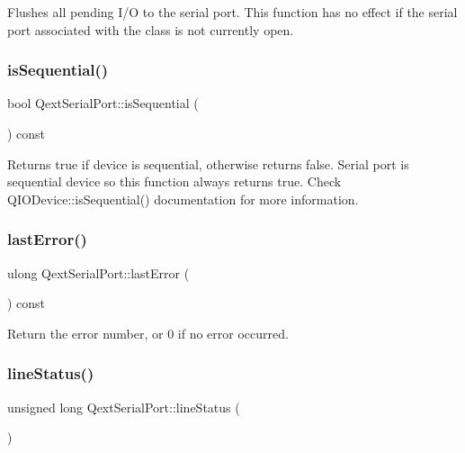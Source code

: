 Flushes all pending I/O to the serial port. This function has no effect if the serial port associated with the class is not currently open. \mbox{\label{classQextSerialPort_ac4b945aa423d599af3b16839247cb711}} 
\subsubsection{\texorpdfstring{is\+Sequential()}{isSequential()}}
{\footnotesize\ttfamily bool Qext\+Serial\+Port\+::is\+Sequential (\begin{DoxyParamCaption}{ }\end{DoxyParamCaption}) const}

Returns true if device is sequential, otherwise returns false. Serial port is sequential device so this function always returns true. Check Q\+I\+O\+Device\+::is\+Sequential() documentation for more information. \mbox{\label{classQextSerialPort_a1061dbec6478575545cd94ed88ba17ca}} 
\subsubsection{\texorpdfstring{last\+Error()}{lastError()}}
{\footnotesize\ttfamily ulong Qext\+Serial\+Port\+::last\+Error (\begin{DoxyParamCaption}{ }\end{DoxyParamCaption}) const}

Return the error number, or 0 if no error occurred. \mbox{\label{classQextSerialPort_a6d12bc6daa415f347e4929f6726fbe5d}} 
\subsubsection{\texorpdfstring{line\+Status()}{lineStatus()}}
{\footnotesize\ttfamily unsigned long Qext\+Serial\+Port\+::line\+Status (\begin{DoxyParamCaption}{ }\end{DoxyParamCaption})}

